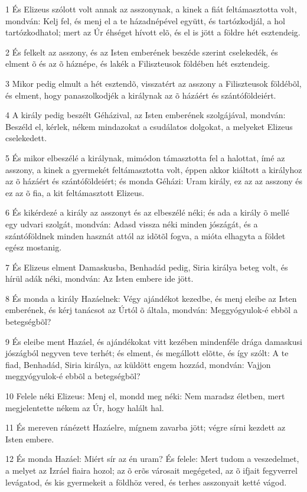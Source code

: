 \par 1 És Elizeus szólott volt annak az asszonynak, a kinek a fiát feltámasztotta volt, mondván: Kelj fel, és menj el a te házadnépével együtt, és tartózkodjál, a hol tartózkodhatol; mert az Úr éhséget hívott elõ, és el is jött a földre hét esztendeig.
\par 2 És felkelt az asszony, és az Isten emberének beszéde szerint cselekedék, és elment õ és az õ háznépe, és lakék a Filiszteusok földében hét esztendeig.
\par 3 Mikor pedig elmult a hét esztendõ, visszatért az asszony a Filiszteusok földébõl, és elment, hogy panaszolkodjék a királynak az õ házáért és szántóföldeiért.
\par 4 A király pedig beszélt Géházival, az Isten emberének szolgájával, mondván: Beszéld el, kérlek, nékem mindazokat a csudálatos dolgokat, a melyeket Elizeus cselekedett.
\par 5 És mikor elbeszélé a királynak, mimódon támasztotta fel a halottat, ímé az asszony, a kinek a gyermekét feltámasztotta volt, éppen akkor kiáltott a királyhoz az õ házáért és szántóföldeiért; és monda Géházi: Uram király, ez az az asszony és ez az õ fia, a kit feltámasztott Elizeus.
\par 6 És kikérdezé a király az asszonyt és az elbeszélé néki; és ada a király õ mellé egy udvari szolgát, mondván: Adasd vissza néki minden jószágát, és a szántóföldnek minden hasznát attól az idõtõl fogva, a mióta elhagyta a földet egész mostanig.
\par 7 És Elizeus elment Damaskusba, Benhadád pedig, Siria királya beteg volt, és hírül adák néki, mondván: Az Isten embere ide jött.
\par 8 És monda a király Hazáelnek: Végy ajándékot kezedbe, és menj eleibe az Isten emberének, és kérj tanácsot az Úrtól õ általa, mondván: Meggyógyulok-é ebbõl a betegségbõl?
\par 9 És eleibe ment Hazáel, és ajándékokat vitt kezében mindenféle drága damaskusi jószágból negyven teve terhét; és elment, és megállott elõtte, és így szólt: A te fiad, Benhadád, Siria királya, az küldött engem hozzád, mondván: Vajjon meggyógyulok-é ebbõl a betegségbõl?
\par 10 Felele néki Elizeus: Menj el, mondd meg néki: Nem maradsz életben, mert megjelentette nékem az Úr, hogy halált hal.
\par 11 És mereven ránézett Hazáelre, mígnem zavarba jött; végre sírni kezdett az Isten embere.
\par 12 És monda Hazáel: Miért sír az én uram? És felele: Mert tudom a veszedelmet, a melyet az Izráel fiaira hozol; az õ erõs városait megégeted, az õ ifjait fegyverrel levágatod, és kis gyermekeit a földhöz vered, és terhes asszonyait ketté vágod.
